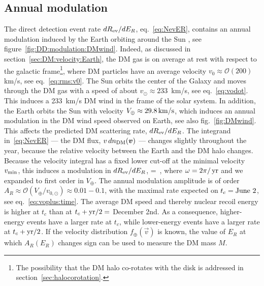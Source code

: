 \subsection{Annual modulation}\label{DMmodulation}
The direct detection event rate $dR_{\rm ev}/dE_R$, eq.~\eqref{eq:NevER}, contains an annual modulation induced by the Earth orbiting around the Sun \cite{DM:annual:mod}, see figure~\ref{fig:DD:modulation:DMwind}.
Indeed, as discussed in section~\ref{sec:DM:velocity:Earth},
the DM gas is on average at rest with respect to the galactic frame\footnote{The possibility that the DM halo co-rotates with the disk is addressed in section~\ref{sec:halocorotation}.},
where DM particles have an average velocity $v_0\approx {\mathcal O}(200)$km/s, see eq.~\eqref{eq:rms:v0}. 
The Sun orbits the center of the Galaxy and moves through the DM gas with a speed of about $v_\odot\approx233$~km/s, see eq.~\eqref{eq:vodot}. 
This induces a 233~km/s DM wind in the frame of the solar system. 
In addition, the Earth orbits the Sun with velocity $V_\oplus\approx 29.8\,{\rm km/s}$, 
which induces an annual modulation in the DM wind speed observed on Earth, see also fig.~\ref{fig:DMwind}. This affects the predicted DM scattering rate, $dR_{\rm ev}/dE_R$.  The integrand in~\eqref{eq:NevER} --- the DM flux, $v \, d n_{\rm DM}(\vec v)$ ---  changes slightly throughout the year, because the relative velocity between the Earth and the DM halo changes. Because the velocity integral  has a fixed lower cut-off at the minimal velocity $v_{\rm min}$, this induces a modulation in $dR_{\rm ev}/dE_R$, 
\beq
\label{eq:annual:mod}
=\,
,
\eeq
where $\omega=2\pi/\yr$ and we expanded to first order in $V_\oplus$. 
The annual modulation amplitude is of order $A_R\approx {\mathcal O}(V_\oplus/v_{0,\odot})\approx 0.01-0.1$,
with the maximal rate expected on $t_c={\rm June~2}$, see eq.~\eqref{eq:voplus:time}. 
The average DM speed and thereby nuclear recoil energy is higher at $t_c$
than at $t_c + {\rm yr}/2 = $  December 2nd.
As a consequence, higher-energy events have a larger rate at $t_c$,
while lower-energy events have a larger rate at $t_c + {\rm yr}/2$.
If the velocity distribution $f_\oplus(\vec v)$ is known, the value of $E_R$ at which $A_R(E_R)$ changes sign can be used to measure the DM mass $M$.



\smallskip

